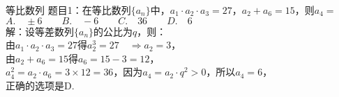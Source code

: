 \documentclass[aspectratio=169]{ctexbeamer} %
\date{\today}
\begin{document}
\begin{frame}[t]{等比数列}
题目1：在等比数列$\{a_n\}$中，$a_1 \cdot a_2 \cdot a_3 = 27$，$a_2 + a_6 = 15$，则$a_4 = $ \\
$A. \quad \pm 6 \qquad B. \quad -6 \qquad C. \quad 36 \qquad D. \quad 6$ \\

\vspace{0.5cm}
\pause
解：设等差数列$\{a_n\}$的公比为$q$，则：\\
\pause
由$a_1 \cdot a_2 \cdot a_3 = 27$得$a_2^3 = 27 \quad \Rightarrow a_2 = 3$，\\
\pause
由$a_2 + a_6 = 15$得$a_6 = 15 - 3 = 12$，\\
\pause
$a_4^2 = a_2 \cdot a_6 = 3 \times 12 = 36$，因为$a_4 = a_2 \cdot q^2 > 0$，所以$a_4 = 6$，\\
\pause
正确的选项是D.
\end{frame}
\end{document}
